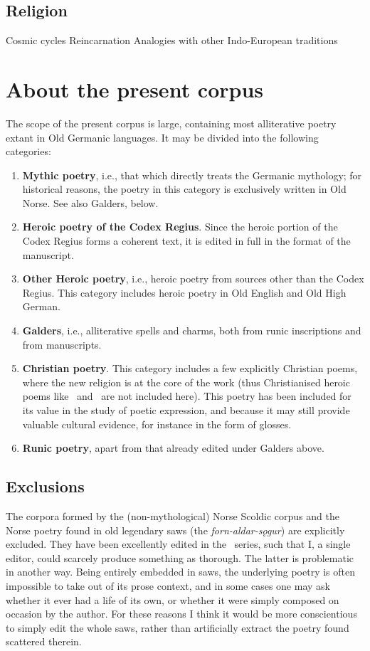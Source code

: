   \subsection{Religion}
    Cosmic cycles
    Reincarnation
    Analogies with other Indo-European traditions

\section{About the present corpus}
  The scope of the present corpus is large, containing most alliterative poetry extant in Old Germanic languages.  It may be divided into the following categories:
  \begin{enumerate}
    \item \textbf{Mythic poetry}, i.e., that which directly treats the Germanic mythology; for historical reasons, the poetry in this category is exclusively written in Old Norse.  See also Galders, below.
    \item \textbf{Heroic poetry of the Codex Regius}.  Since the heroic portion of the Codex Regius forms a coherent text, it is edited in full in the format of the manuscript.
    \item \textbf{Other Heroic poetry}, i.e., heroic poetry from sources other than the Codex Regius.  This category includes heroic poetry in Old English and Old High German.
    \item \textbf{Galders}, i.e., alliterative spells and charms, both from runic inscriptions and from manuscripts.
    \item \textbf{Christian poetry}.  This category includes a few explicitly Christian poems, where the new religion is at the core of the work (thus Christianised heroic poems like \Beowulf\ and \Hildebrandslied\ are not included here).  This poetry has been included for its value in the study of poetic expression, and because it may still provide valuable cultural evidence, for instance in the form of glosses.
    \item \textbf{Runic poetry}, apart from that already edited under Galders above.
  \end{enumerate}

  \subsection{Exclusions}
    The corpora formed by the (non-mythological) Norse Scoldic corpus and the Norse poetry found in old legendary saws (the \emph{forn-aldar-sǫgur}) are explicitly excluded.  They have been excellently edited in the \Skp\ series, such that I, a single editor, could scarcely produce something as thorough.  The latter is problematic in another way.  Being entirely embedded in saws, the underlying poetry is often impossible to take out of its prose context, and in some cases one may ask whether it ever had a life of its own, or whether it were simply composed on occasion by the author.  For these reasons I think it would be more conscientious to simply edit the whole saws, rather than artificially extract the poetry found scattered therein.

